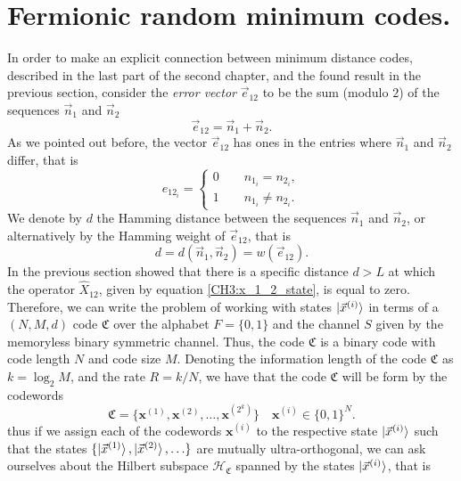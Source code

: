 \section{Fermionic random minimum codes.}
In order to make an explicit connection between minimum distance codes, described in the last part of the second chapter, and the found result in the previous section, consider the \textit{error vector} $\vec{e}_{12}$ to be the sum (modulo $2$) of the sequences $\vec{n}_1$ and $\vec{n}_2$
\begin{equation}
\vec{e}_{12} = \vec{n}_1 + \vec{n}_2.
\end{equation} 
As we pointed out before, the vector $\vec{e}_{12}$ has ones in the entries where $\vec{n}_1$ and $\vec{n}_2$ differ, that is
\begin{equation}
e_{12_{i}}= \begin{cases} 0\qquad n_{1_i}=n_{2_i},\\
1 \qquad n_{1_i}\neq n_{2_i}.
 \end{cases}
\end{equation}
We denote by $d$ the Hamming distance between the sequences $\vec{n}_1$ and $\vec{n}_2$, or alternatively by the Hamming weight of $\vec{e}_{12}$, that is
\begin{equation}
d=d(\vec{n}_1,\vec{n}_2) = w(\vec{e}_{12}).
\end{equation}
In the previous section showed that there is a specific distance $d>L$ at which the operator $\hat{X}_{12}$, given by equation \eqref{CH3:x_1_2_state}, is equal to zero. Therefore, we can write the problem of working with states $\mathinner{|{\vec{x}^{(i)}}\rangle}$ in terms of a $(N,M,d)$ code $\mathfrak{C}$ over the alphabet $F=\{0,1\}$ and the channel $S$ given by the memoryless binary symmetric channel. Thus, the code $\mathfrak{C}$ is a binary code with code length $N$ and code size $M$. Denoting the information length of the code $\mathfrak{C}$ as $k=\log_2 M$, and the rate $R=k/N$, we have that the code $\mathfrak{C}$ will be form by the codewords
\begin{equation}
\mathfrak{C}=\{\mathbf{x}^{(1)},\mathbf{x}^{(2)},\ldots,\mathbf{x}^{(2^k)}\} \quad \mathbf{x}^{(i)}\in\{0,1\}^{N}.
\end{equation}
thus if we assign each of the codewords $\mathbf{x}^{(i)}$ to the respective state $\mathinner{|{\vec{x}^{(i)}}\rangle}$ such that the states $\{\mathinner{|{\vec{x}^{(1)}}\rangle},\mathinner{|{\vec{x}^{(2)}}\rangle},\ldots\}$ are mutually ultra-orthogonal, we can ask ourselves about the Hilbert subspace $\mathcal{H}_{\mathfrak{C}}$ spanned by the states $\mathinner{|{\vec{x}^{(i)}}\rangle}$, that is
